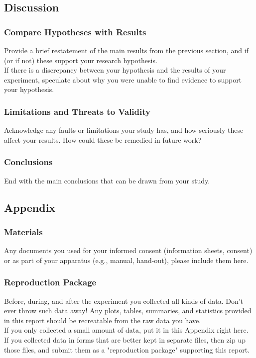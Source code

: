\documentclass[unicode,11pt,a4paper,oneside,numbers=endperiod,openany]{scrartcl}
\begin{document}
\subsection{Discussion}

    \subsubsection{Compare Hypotheses with Results}

    Provide a brief restatement of the main results from the previous section, and if (or if not) these support your research hypothesis.\\

    If there is a discrepancy between your hypothesis and the results of your experiment, speculate about why you were unable to find evidence to support your hypothesis. 


    \subsubsection{Limitations and Threats to Validity}

    Acknowledge any faults or limitations your study has, and how seriously these affect your results. How could these be remedied in future work?


    \subsubsection{Conclusions}
    End with the main conclusions that can be drawn from your study.

\subsection{Appendix}
    \subsubsection{Materials}

    Any documents you used for your informed consent (information sheets, consent) or as part of your apparatus (e.g., manual, hand-out), please include them here.


    \subsubsection{Reproduction Package}

    Before, during, and after the experiment you collected all kinds of data. Don't ever throw such data away! Any plots, tables, summaries, and statistics provided in this report should be recreatable from the raw data you have.\\

    If you only collected a small amount of data, put it in this Appendix right here.\\

    If you collected data in forms that are better kept in separate files, then zip up those files, and submit them as a "reproduction package" supporting this report.
\end{document}
